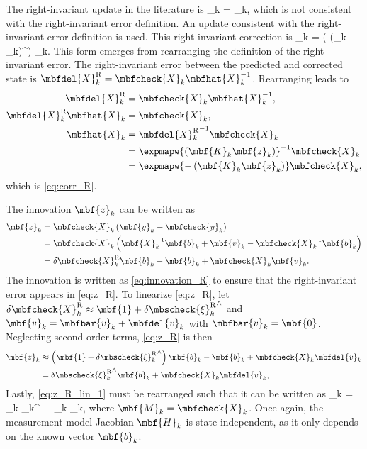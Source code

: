 The right-invariant update in the literature is
\bdis
	_k = _k,
\edis
which is not consistent with the right-invariant error definition. An update consistent with the right-invariant error definition is used. This right-invariant correction is 
\beq
	_k = \exp\left(-\left(_k _k\right)^\wedge\right) _k.
	\label{eq:corr_R} 
\eeq
This form emerges from rearranging the definition of the right-invariant error. The right-invariant error between the predicted and corrected state is $\mbfdel{X}_k^\textrm{R} = \mbfcheck{X}_k\mbfhat{X}_k^{-1}$. Rearranging leads to
\begin{align}
	\mbfdel{X}_k^\textrm{R} &= \mbfcheck{X}_k\mbfhat{X}_k^{-1}, \notag \\
	\mbfdel{X}_k^\textrm{R}\mbfhat{X}_k &= \mbfcheck{X}_k, \notag \\
	\mbfhat{X}_k &=  {\mbfdel{X}_k^\textrm{R}}^{-1}\mbfcheck{X}_k \notag \\
	&= \expmapw{\left(\mbf{K}_k\mbf{z}_k\right)}^{-1}\mbfcheck{X}_k \notag \\
	&= \expmapw{-\left(\mbf{K}_k\mbf{z}_k\right)} \mbfcheck{X}_k, \notag
\end{align}
which is \eqref{eq:corr_R}.

The innovation $\mbf{z}_k$ can be written as
\begin{align}
	\mbf{z}_k & = \mbfcheck{X}_k\left(\mbf{y}_k - \mbfcheck{y}_k\right) \label{eq:innovation_R} \\ 
	& = \mbfcheck{X}_k\left( \mbf{X}_k^{-1}\mbf{b}_k + \mbf{v}_k - \mbfcheck{X}_k^{-1}\mbf{b}_k\right) \nonumber \\
	& = \delta \mbfcheck{X}_k^\mathrm{R}\mbf{b}_k  - \mbf{b}_k + \mbfcheck{X}_k\mbf{v}_k. \label{eq:z_R}
\end{align}
The innovation is written as \eqref{eq:innovation_R} to ensure that the right-invariant error appears in \eqref{eq:z_R}.
To linearize \eqref{eq:z_R}, let $\delta \mbfcheck{X}_k^\mathrm{R} \approx \mbf{1} + \delta {\mbscheck{\xi}_k^\mathrm{R}}^\wedge$ and $\mbf{v}_k = \mbfbar{v}_k + \mbfdel{v}_k$ with $\mbfbar{v}_k = \mbf{0}$. Neglecting second order terms, \eqref{eq:z_R} is then 
\begin{align}
	\mbf{z}_k &\approx \left(\mbf{1} +  \delta {\mbscheck{\xi}_k^\mathrm{R}}^\wedge\right)\mbf{b}_k - \mbf{b}_k + \mbfcheck{X}_k\mbfdel{v}_k \nonumber \\
	 & = \delta {\mbscheck{\xi}_k^\mathrm{R}}^\wedge\mbf{b}_k + \mbfcheck{X}_k\mbfdel{v}_k, \label{eq:z_R_lin_1}
\end{align}
Lastly, \eqref{eq:z_R_lin_1} must be rearranged such that it can be written as 
\beq
	_k  =  _k \delta \mbscheck{\xi}_k^ + _k _k,
\label{eq:z_R_lin}
\eeq
where $\mbf{M}_k = \mbfcheck{X}_k$. Once again, the measurement model Jacobian $\mbf{H}_k$ is state independent, as it only depends on the known vector $\mbf{b}_k$.

